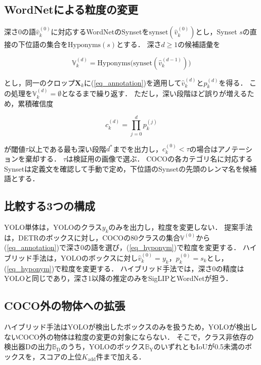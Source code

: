 \subsection{WordNetによる粒度の変更}
深さ0の語$ \hat{v}_k^{(0)} $に対応するWordNetのSynsetを$ \mathrm{synset}(\hat{v}_k^{(0)}) $とし，Synset $ s $の直接の下位語の集合を$ \mathrm{Hyponyms}(s) $とする．
深さ$ d \geq 1 $の候補語彙を

\begin{equation}
    {\mathbb V}_k^{(d)} = \mathrm{Hyponyms} \bigl( \mathrm{synset}( \hat{v}_k^{(d-1)} ) \bigr)
    \label{eq_hyponym}
\end{equation}

\noindent
とし，同一のクロップ$ {\mathbf X}_k $に(\ref{eq_annotation})を適用して$ \hat{v}_k^{(d)} $と$ p_k^{(d)} $を得る．
この処理を$ {\mathbb V}_k^{(d)} = \emptyset $となるまで繰り返す．
ただし，深い段階ほど誤りが増えるため，累積確信度

\begin{equation}
    c_k^{(d)} = \prod_{j=0}^{d} p_k^{(j)}
    \label{eq_cumulative}
\end{equation}

\noindent
が閾値$ \tau $以上である最も深い段階$ d^\ast $までを出力し，$ c_k^{(0)} < \tau $の場合はアノテーションを棄却する．
$ \tau $は検証用の画像で選ぶ．
COCOの各カテゴリ名に対応するSynsetは定義文を確認して手動で定め，下位語のSynsetの先頭のレンマ名を候補語とする．

\subsection{比較する3つの構成}
YOLO単体は，YOLOのクラス$ y_k $のみを出力し，粒度を変更しない．
提案手法は，DETRのボックスに対し，COCOの80クラスの集合$ {\mathbb V}^{(0)} $から(\ref{eq_annotation})で深さ0の語を選び，(\ref{eq_hyponym})で粒度を変更する．
ハイブリッド手法は，YOLOのボックスに対し$ \hat{v}_k^{(0)} = y_k $，$ p_k^{(0)} = s_k $とし，(\ref{eq_hyponym})で粒度を変更する．
ハイブリッド手法では，深さ0の精度はYOLOと同じであり，深さ1以降の推定のみをSigLIPとWordNetが担う．

\subsection{COCO外の物体への拡張}
ハイブリッド手法はYOLOが検出したボックスのみを扱うため，YOLOが検出しないCOCO外の物体は粒度の変更の対象にならない．
そこで，クラス非依存の検出器Dの出力$ {\mathbb B}_{\mathrm{D}} $のうち，YOLOのボックス$ {\mathbb B}_{\mathrm{Y}} $のいずれともIoUが0.5未満のボックスを，スコアの上位$ K_{\mathrm{add}} $件まで加える．

